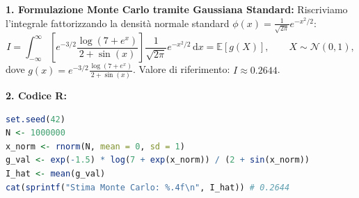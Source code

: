 \documentclass[11pt,a4paper]{article}
\newcommand{\EE}{\mathbb{E}}
\newcommand{\dx}{\mathrm{d}x}
\begin{document}
\begin{soluzionebox}
\textbf{1. Formulazione Monte Carlo tramite Gaussiana Standard:}
Riscriviamo l'integrale fattorizzando la densità normale standard $\phi(x) = \frac{1}{\sqrt{2\pi}} e^{-x^2/2}$:
\[
I = \int_{-\infty}^\infty \left[ e^{-3/2} \frac{\log(7 + e^x)}{2 + \sin(x)} \right] \frac{1}{\sqrt{2\pi}} e^{-x^2/2} \, \dx = \EE[g(X)], \qquad X \sim \mathcal{N}(0, 1),
\]
dove $g(x) = e^{-3/2} \frac{\log(7 + e^x)}{2 + \sin(x)}$. Valore di riferimento: $I \approx \mathbf{0.2644}$.

\textbf{2. Codice R:}
\begin{lstlisting}[language=R]
set.seed(42)
N <- 1000000
x_norm <- rnorm(N, mean = 0, sd = 1)
g_val <- exp(-1.5) * log(7 + exp(x_norm)) / (2 + sin(x_norm))
I_hat <- mean(g_val)
cat(sprintf("Stima Monte Carlo: %.4f\n", I_hat)) # 0.2644
\end{lstlisting}
\end{soluzionebox}
\end{document}
